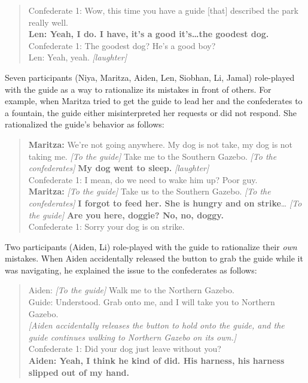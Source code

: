 \begin{quote}
Confederate 1: Wow, this time you have a guide [that] described the park really well.\\
\textbf{Len: Yeah, I do. I have, it's a good it's…the goodest dog.}\\
Confederate 1: The goodest dog? He's a good boy?\\
Len: Yeah, yeah. \textit{[laughter]}
\end{quote}

Seven participants (Niya, Maritza, Aiden, Len, Siobhan, Li, Jamal) role-played with the guide as a way to rationalize its mistakes in front of others. For example, when Maritza tried to get the guide to lead her and the confederates to a fountain, the guide either misinterpreted her requests or did not respond. She rationalized the guide’s behavior as follows:

\begin{quote}
\textbf{Maritza:} We're not going anywhere. My dog is not take, my dog is not taking me. \textit{[To the guide]} Take me to the Southern Gazebo. \textit{[To the confederates]} \textbf{My dog went to sleep.} \textit{[laughter]}\\
Confederate 1: I mean, do we need to wake him up? Poor guy.\\
\textbf{Maritza:} \textit{[To the guide]} Take us to the Southern Gazebo. \textit{[To the confederates]} \textbf{I forgot to feed her. She is hungry and on strike}… \textit{[To the guide]} \textbf{Are you here, doggie? No, no, doggy.}\\
Confederate 1: Sorry your dog is on strike.
\end{quote}

Two participants (Aiden, Li) role-played with the guide to rationalize their \textit{own} mistakes. When Aiden accidentally released the button to grab the guide while it was navigating, he explained the issue to the confederates as follows:

\begin{quote}
Aiden: \textit{[To the guide]} Walk me to the Northern Gazebo.\\
Guide: Understood. Grab onto me, and I will take you to Northern Gazebo.\\
\textit{[Aiden accidentally releases the button to hold onto the guide, and the guide continues walking to Northern Gazebo on its own.]}\\
Confederate 1: Did your dog just leave without you?\\
\textbf{Aiden: Yeah, I think he kind of did. His harness, his harness slipped out of my hand.}
\end{quote}

